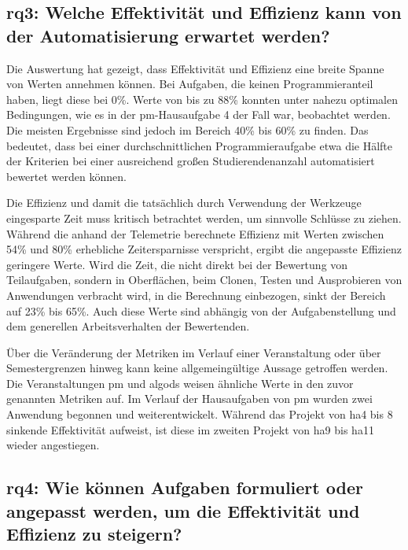 \subsection[\acs{rq}3]{\ac{rq}3: Welche Effektivität und Effizienz kann von der Automatisierung erwartet werden?}\label{subsec:ra3-effectivity-efficiency}

Die Auswertung hat gezeigt, dass Effektivität und Effizienz eine breite Spanne von Werten annehmen können.
Bei Aufgaben, die keinen Programmieranteil haben, liegt diese bei 0\%.
Werte von bis zu 88\% konnten unter nahezu optimalen Bedingungen, wie es in der \ac{pm}-Hausaufgabe 4 der Fall war, beobachtet werden.
Die meisten Ergebnisse sind jedoch im Bereich 40\% bis 60\% zu finden.
Das bedeutet, dass bei einer durchschnittlichen Programmieraufgabe etwa die Hälfte der Kriterien bei einer ausreichend großen Studierendenanzahl automatisiert bewertet werden können.

Die Effizienz und damit die tatsächlich durch Verwendung der Werkzeuge eingesparte Zeit muss kritisch betrachtet werden, um sinnvolle Schlüsse zu ziehen.
Während die anhand der Telemetrie berechnete Effizienz mit Werten zwischen 54\% und 80\% erhebliche Zeitersparnisse verspricht, ergibt die angepasste Effizienz geringere Werte.
Wird die Zeit, die nicht direkt bei der Bewertung von Teilaufgaben, sondern in Oberflächen, beim Clonen, Testen und Ausprobieren von Anwendungen verbracht wird, in die Berechnung einbezogen, sinkt der Bereich auf 23\% bis 65\%.
Auch diese Werte sind abhängig von der Aufgabenstellung und dem generellen Arbeitsverhalten der Bewertenden.

Über die Veränderung der Metriken im Verlauf einer Veranstaltung oder über Semestergrenzen hinweg kann keine allgemeingültige Aussage getroffen werden.
Die Veranstaltungen \ac{pm} und \ac{algods} weisen ähnliche Werte in den zuvor genannten Metriken auf.
Im Verlauf der Hausaufgaben von \ac{pm} wurden zwei Anwendung begonnen und weiterentwickelt.
Während das Projekt von \ac{ha}4 bis 8 sinkende Effektivität aufweist, ist diese im zweiten Projekt von \ac{ha}9 bis \ac{ha}11 wieder angestiegen.

\subsection[\acs{rq}4]{\ac{rq}4: Wie können Aufgaben formuliert oder angepasst werden, um die Effektivität und Effizienz zu steigern?}\label{subsec:ra4-improve-effectivity-efficiency}

